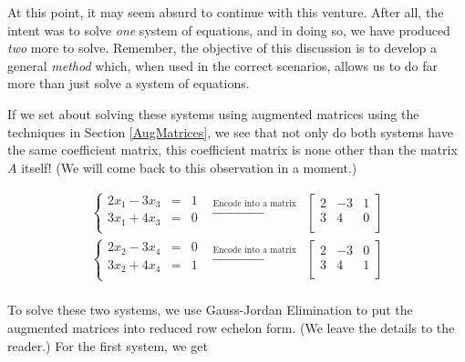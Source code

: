 \documentclass{ximera}
\begin{document}
At this point, it may seem absurd to continue with this venture.  After all, the intent was to solve \textit{one} system of equations, and in doing so, we have produced \textit{two} more to solve.  Remember, the objective of this discussion is to develop a general \textit{method} which, when used in the correct scenarios, allows us to do far more than just solve a system of equations. 

 If we set about solving these systems using augmented matrices using the techniques in Section \ref{AugMatrices}, we see that not only do both systems have the same coefficient matrix, this coefficient matrix is none other than the matrix $A$ itself!  (We will come back to this observation in a moment.)  

\[ \begin{array}{ccc}

\left\{ \begin{array}{rcr} 2x_1-3x_3 & = & 1 \\ 3x_1+4x_3 & = & 0 \\ \end{array} \right.

&
\xrightarrow{\text{Encode into a matrix}}

&
\left[ \begin{array}{rr|r} 2 & -3 & 1 \\ 3 & 4 & 0 \\ \end{array} \right] \\  


\left\{ \begin{array}{rcr} 2x_2-3x_4 & = & 0 \\ 3x_2+4x_4 & = & 1 \\ \end{array} \right. 

&
\xrightarrow{\text{Encode into a matrix}}

&

\left[ \begin{array}{rr|r} 2 & -3 & 0 \\ 3 & 4 & 1 \\ \end{array} \right] \\

\end{array} \]

To solve these two systems, we use Gauss-Jordan Elimination to put the augmented matrices into reduced row echelon form. (We leave the details to the reader.) For the first system, we get 
\end{document}

